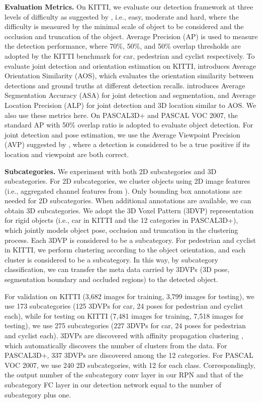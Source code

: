 \documentclass[10pt,twocolumn,letterpaper]{article}
\begin{document}
	


\noindent \textbf{Evaluation Metrics.} On KITTI, we evaluate our detection framework at three levels of difficulty as suggested by \cite{KITTIObject}, i.e., easy, moderate and hard, where the difficulty is measured by the minimal scale of object to be considered and the occlusion and truncation of the object. Average Precision (AP) \cite{pascal-voc-2012} is used to measure the detection performance, where 70\%, 50\%, and 50\% overlap thresholds are adopted by the KITTI benchmark for car, pedestrian and cyclist respectively. To evaluate joint detection and orientation estimation on KITTI, \cite{geiger2012we} introduces Average Orientation Similarity (AOS), which evaluates the orientation similarity between detections and ground truths at different detection recalls. \cite{xiang2015data} introduces Average Segmentation Accuracy (ASA) for joint detection and segmentation, and Average Location Precision (ALP) for joint detection and 3D location similar to AOS. We also use these metrics here. On PASCAL3D+ and PASCAL VOC 2007, the standard AP with 50\% overlap ratio is adopted to evaluate object detection. For joint detection and pose estimation, we use the Average Viewpoint Precision (AVP) suggested by \cite{xiang2014beyond}, where a detection is considered to be a true positive if its location and viewpoint are both correct.

\noindent \textbf{Subcategories.} We experiment with both 2D subcategories and 3D subcategories. For 2D subcategories, we cluster objects using 2D image features (i.e., aggregated channel features from \cite{DollarPAMI14pyramids}). Only bounding box annotations are needed for 2D subcategories. When additional annotations are available, we can obtain 3D subcategories. We adopt the 3D Voxel Pattern (3DVP) representation \cite{xiang2015data} for rigid objects (i.e., car in KITTI and the 12 categories in PASCAL3D+), which jointly models object pose, occlusion and truncation in the clustering process. Each 3DVP is considered to be a subcategory. For pedestrian and cyclist in KITTI, we perform clustering according to the object orientation, and each cluster is considered to be a subcategory. In this way, by subcategory classification, we can transfer the meta data carried by 3DVPs (3D pose, segmentation boundary and occluded regions) to the detected object. 

For validation on KITTI (3,682 images for training, 3,799 images for testing), we use 173 subcategories (125 3DVPs for car, 24 poses for pedestrian and cyclist each), while for testing on KITTI (7,481 images for training, 7,518 images for testing), we use 275 subcategories (227 3DVPs for car, 24 poses for pedestrian and cyclist each). 3DVPs are discovered with affinity propagation clustering \cite{frey2007clustering}, which automatically discovers the number of clusters from the data.  For PASCAL3D+, 337 3DVPs are discovered among the 12 categories. For PASCAL VOC 2007, we use 240 2D subcategories, with 12 for each class. Correspondingly, the output number of the subcategory conv layer in our RPN and that of the subcategory FC layer in our detection network equal to the number of subcategory plus one.
\end{document}
